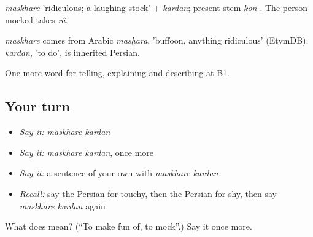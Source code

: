 \emph{maskhare} 'ridiculous; a laughing stock' + \emph{kardan}; present stem \emph{kon-}. The person mocked takes \emph{râ}.

\begin{cousinweb}
\emph{maskhare} comes from Arabic \emph{masḫara}, 'buffoon, anything ridiculous' (EtymDB). \emph{kardan}, 'to do', is inherited Persian.
\end{cousinweb}

\begin{grammarlens}[title={What you've built}]
One more word for telling, explaining and describing at B1.
\end{grammarlens}

\subsection*{Your turn}
\begin{itemize}
\raggedright
  \item \emph{Say it:} \emph{maskhare kardan}
  \item \emph{Say it:} \emph{maskhare kardan}, once more
  \item \emph{Say it:} a sentence of your own with \emph{maskhare kardan}
  \item \emph{Recall:} say the Persian for touchy, then the Persian for shy, then say \emph{maskhare kardan} again
\end{itemize}

\begin{tcolorbox}[breakable,colback=teal!4,colframe=teal!35!black,title={Before you move on}]
What does   mean? (\textquotedblleft{}To make fun of, to mock\textquotedblright{}.) Say it once more.
\end{tcolorbox}

